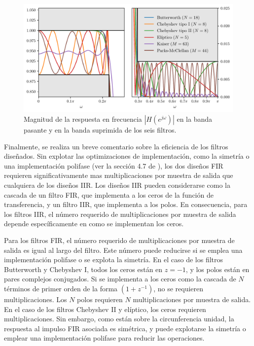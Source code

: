 \documentclass[a4paper]{report}
\begin{document}
\begin{figure}[!htb]
 \begin{center}
 \includegraphics[width=1\textwidth]{figuras/filter_design_upsampling_filter_sec_07_10_zoom.pdf}
 \caption{\label{fig:filter_design_upsampling_filter_sec_07_10_zoom} Magnitud de la respuesta en frecuencia \(|H(e^{j\omega})|\) en la banda pasante y en la banda suprimida de los seis filtros.}
 \end{center}
\end{figure}

Finalmente, se realiza un breve comentario sobre la eficiencia de los filtros diseñados. Sin explotar las optimizaciones de implementación, como la simetría o una implementación polifase (ver la sección 4.7 de \cite{oppenheim2009discrete}), los dos diseños FIR requieren significativamente mas multiplicaciones por muestra de salida que cualquiera de los diseños IIR. Los diseños IIR pueden considerarse como la cascada de un filtro FIR, que implementa a los ceros de la función de transferencia, y un filtro IIR, que implementa a los polos. En consecuencia, para los filtros IIR, el número requerido de multiplicaciones por muestra de salida depende específicamente en como se implementan los ceros.

Para los filtros FIR, el número requerido de multiplicaciones por muestra de salida es igual al largo del filtro. Este número puede reducirse si se emplea una implementación polifase o se explota la simetría. En el caso de los filtros Butterworth y Chebyshev I, todos los ceros están en \(z=-1\), y los polos están en pares complejos conjugados. Si se implementa a los ceros como la cascada de \(N\) términos de primer orden de la forma \((1+z^{-1})\), no se requieren multiplicaciones. Los \(N\) polos requieren \(N\) multiplicaciones por muestra de salida. En el caso de los filtros Chebyshev II y elíptico, los ceros requieren multiplicaciones. Sin embargo, como están sobre la circunferencia unidad, la respuesta al impulso FIR asociada es simétrica, y puede explotarse la simetría o emplear una implementación polifase para reducir las operaciones.
\end{document}
